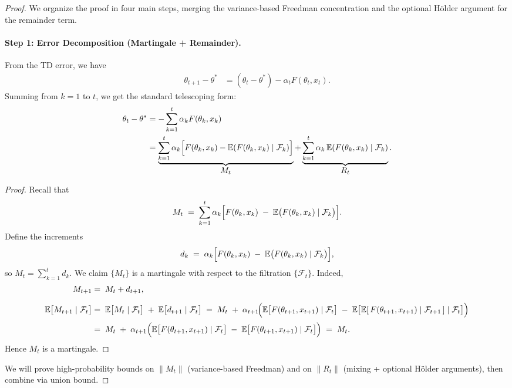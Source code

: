 \begin{proof}
\;\newline
We organize the proof in four main steps, merging the variance-based Freedman concentration and the optional H\"older argument for the remainder term.
\paragraph{Step 1: Error Decomposition (Martingale + Remainder).}
From the TD error, we have
\begin{align*}
\theta_{t+1} - \theta^* 
&= (\theta_t - \theta^*) - \alpha_t F(\theta_t, x_t).
\end{align*}
Summing from $k=1$ to $t$, we get the standard telescoping form:
\begin{align}
\theta_t - \theta^*
&=
-\sum_{k=1}^t \alpha_k F(\theta_k, x_k) \\
&=
\underbrace{\sum_{k=1}^t \alpha_k \Bigl[F(\theta_k, x_k) 
   - \mathbb{E}(F(\theta_k, x_k) \mid \mathcal{F}_k) \Bigr]}_{\displaystyle M_t}
+ \underbrace{\sum_{k=1}^t \alpha_k \,
   \mathbb{E}(F(\theta_k, x_k) \mid \mathcal{F}_k)}_{\displaystyle R_t}.
\label{eq:theta-t-decomp}
\end{align}
\begin{proof}
Recall that
\[
  M_t 
  \;=\; 
  \sum_{k=1}^t 
  \alpha_k \Bigl[
    F(\theta_k, x_k) 
    \;-\;
    \mathbb{E}\bigl(F(\theta_k,x_k) \mid \mathcal{F}_k\bigr)
  \Bigr].
\]
Define the increments 
\[
  d_k 
  \;=\; 
  \alpha_k \Bigl[
    F(\theta_k, x_k) 
    \;-\;
    \mathbb{E}\bigl(F(\theta_k,x_k) \mid \mathcal{F}_k\bigr)
  \Bigr],
\]
so \(M_t = \sum_{k=1}^t d_k\). We claim \(\{M_t\}\) is a martingale with respect to the filtration \(\{\mathcal{F}_t\}\). Indeed,
\begin{align*}
M_{t+1} 
&=\; 
M_t + d_{t+1},\\[6pt]
\mathbb{E}\bigl[M_{t+1} \mid \mathcal{F}_t\bigr]
&=\; 
\mathbb{E}\bigl[M_t \mid \mathcal{F}_t\bigr]
\;+\;
\mathbb{E}\bigl[d_{t+1} \mid \mathcal{F}_t\bigr]
\;=\;
M_t 
\;+\;
\alpha_{t+1}\!\Bigl(
  \mathbb{E}\bigl[F(\theta_{t+1},x_{t+1}) \mid \mathcal{F}_t\bigr]
  \;-\;
  \mathbb{E}\bigl[
    \mathbb{E}[\,F(\theta_{t+1},x_{t+1}) \mid \mathcal{F}_{t+1}\,]
    \mid \mathcal{F}_t
  \bigr]
\Bigr)\\[2pt]
&=\; 
M_t 
\;+\;
\alpha_{t+1}\Bigl(
  \mathbb{E}\bigl[F(\theta_{t+1},x_{t+1}) \mid \mathcal{F}_t\bigr]
  \;-\;
  \mathbb{E}\bigl[F(\theta_{t+1},x_{t+1}) \mid \mathcal{F}_t\bigr]
\Bigr)
\;=\;
M_t.
\end{align*}
Hence \(M_t\) is a martingale.
\end{proof}
We will prove high-probability bounds on $\|M_t\|$ (variance-based Freedman) and on $\|R_t\|$ (mixing + optional H\"older arguments), then combine via union bound.

\end{proof}
